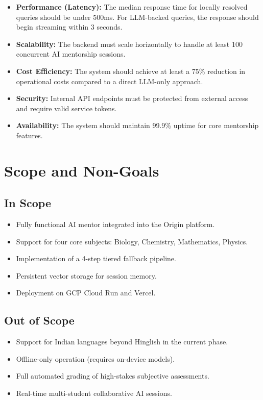 \begin{itemize}
    \item \textbf{Performance (Latency):} The median response time for locally resolved queries should be under 500ms. For LLM-backed queries, the response should begin streaming within 3 seconds.
    \item \textbf{Scalability:} The backend must scale horizontally to handle at least 100 concurrent AI mentorship sessions.
    \item \textbf{Cost Efficiency:} The system should achieve at least a 75\% reduction in operational costs compared to a direct LLM-only approach.
    \item \textbf{Security:} Internal API endpoints must be protected from external access and require valid service tokens.
    \item \textbf{Availability:} The system should maintain 99.9\% uptime for core mentorship features.
\end{itemize}

\section{Scope and Non-Goals}

\subsection{In Scope}
\begin{itemize}
    \item Fully functional AI mentor integrated into the Origin platform.
    \item Support for four core subjects: Biology, Chemistry, Mathematics, Physics.
    \item Implementation of a 4-step tiered fallback pipeline.
    \item Persistent vector storage for session memory.
    \item Deployment on GCP Cloud Run and Vercel.
\end{itemize}

\subsection{Out of Scope}
\begin{itemize}
    \item Support for Indian languages beyond Hinglish in the current phase.
    \item Offline-only operation (requires on-device models).
    \item Full automated grading of high-stakes subjective assessments.
    \item Real-time multi-student collaborative AI sessions.
\end{itemize}


